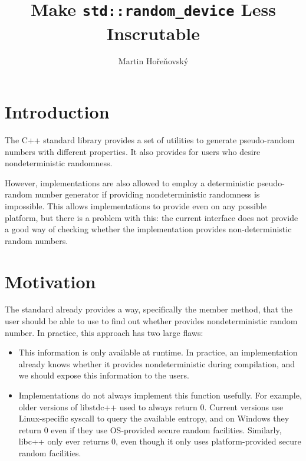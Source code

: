 \documentclass{wg21}
\title{Make \texttt{std::random\_device} Less Inscrutable}
\author{Martin Hořeňovský}{martin.horenovsky@gmail.com}
\begin{document}
\maketitle



\hypertarget{introduction}{%
    \section{Introduction}\label{introduction}}

The C++ standard library provides a set of utilities to generate
pseudo-random numbers with different properties. It also provides
 for users who desire nondeterministic
randomness.

However, implementations are also allowed to employ a deterministic
pseudo-random number generator if providing nondeterministic randomness
is impossible. This allows implementations to provide
 even on any possible platform, but there
is a problem with this: the current interface does not provide a good
way of checking whether the implementation provides non-deterministic
random numbers.


\hypertarget{motivation}{%
    \section{Motivation}\label{motivation}}

The standard already provides a way, specifically the
 member method, that the user should
be able to use to find out whether  provides
nondeterministic random number. In practice, this approach has two large
flaws:

\begin{itemize}
    \item This information is only available at runtime. In practice,
          an implementation already knows whether it provides
          nondeterministic during compilation, and we should expose this
          information to the users.
    \item Implementations do not always implement this function usefully.
          For example, older versions of libstdc++ used to always return 0.
          Current versions use Linux-specific syscall to query the
          available entropy, and on Windows they return 0 even if they use
          OS-provided secure random facilities. Similarly, libc++ only ever
          returns 0, even though it only uses platform-provided secure
          random facilities.
\end{itemize}
\end{document}
